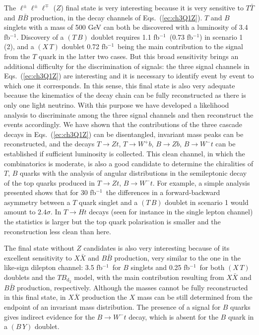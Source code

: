 \documentclass[12pt,a4paper]{article}
\newcommand{\fbin}{fb$^{-1}$}
\newcommand{\TT}{T \bar T}
\newcommand{\BB}{B \bar B}
\newcommand{\XX}{X \bar X}
\newcommand{\TBD}{TB_{\text{d}_2}}
\newcommand{\TB}{(T \, B)}
\newcommand{\XT}{(X \, T)}
\newcommand{\BY}{(B \, Y)}
\begin{document}
The $\ell^\pm \ell^\pm \ell^\mp$ ($Z$) final state is very interesting because it is very sensitive to $\TT$ and $\BB$ production, in the decay channels of Eqs.~(\ref{ec:ch3Q1Z}). $T$ and $B$ singlets with a mass of 500 GeV can both be discovered with a luminosity of 3.4 \fbin. Discovery of a $\TB$ doublet requires 1.1 \fbin\ (0.73 \fbin) in scenario 1 (2), and a $\XT$ doublet 0.72 \fbin\, being the main contribution to the signal from the $T$ quark in the latter two cases. But this broad sensitivity brings an additional difficulty for the discrimination of signals: the three signal channels in Eqs.~(\ref{ec:ch3Q1Z}) are interesting and it is necessary to identify event by event to which one it corresponds. In this sense, this final state is also very adequate because the kinematics of the decay chain can be fully reconstructed  as there is only one light neutrino. With this purpose we have developed a likelihood analysis to discriminate among the 
three signal channels and then reconstruct the events accordingly.
We have shown that the contributions of the three cascade decays in Eqs.~(\ref{ec:ch3Q1Z}) can be disentangled, invariant mass peaks can be reconstructed, and the decays $T \to Zt$, $T \to W^+ b$, $B \to Zb$, $B \to W^-t$ can be established if sufficient luminosity is collected. This clean channel, in which the combinatorics is  moderate, is also a good candidate to determine the chiralities of $T$, $B$ quarks with the analysis of
angular distributions in the semileptonic decay of the top quarks produced in
$T \to Zt$, $B \to W^- t$. For example, a simple analysis presented shows that for 30 \fbin\ the differences in a forward-backward asymmetry between a $T$ quark singlet and a $\TB$ doublet in scenario 1 would amount to $2.4\sigma$. In $T \to Ht$ decays (seen for instance in the single lepton channel) the statistics is larger but the top quark polarisation is smaller and the reconstruction less clean than here.

The final state without $Z$ candidates is also very interesting because of its excellent sensitivity to $\XX$ and $\BB$ production, very similar to the one in the like-sign dilepton channel: 3.5 \fbin\ for $B$ singlets and 0.25 \fbin\ for both $\XT$ doublets and the $\TBD$ model, with the main contribution resulting from $\XX$ and $\BB$ production, respectively. Although the masses cannot be fully reconstructed in this final state, in $\XX$ production the $X$ mass can be still determined from the endpoint of an invariant mass distribution. The presence of a signal for $B$ quarks gives indirect evidence for the $B \to W^- t$ decay, which is absent for the $B$ quark in a $\BY$ doublet.
\end{document}
